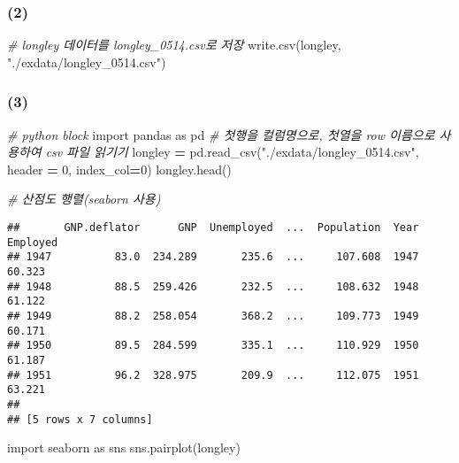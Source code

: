 \documentclass[
]{article}
\newenvironment{Shaded}{\begin{snugshade}}{\end{snugshade}}
\newcommand{\CommentTok}[1]{\textcolor[rgb]{0.56,0.35,0.01}{\textit{#1}}}
\newcommand{\DecValTok}[1]{\textcolor[rgb]{0.00,0.00,0.81}{#1}}
\newcommand{\FunctionTok}[1]{\textcolor[rgb]{0.00,0.00,0.00}{#1}}
\newcommand{\ImportTok}[1]{#1}
\newcommand{\NormalTok}[1]{#1}
\newcommand{\OperatorTok}[1]{\textcolor[rgb]{0.81,0.36,0.00}{\textbf{#1}}}
\newcommand{\StringTok}[1]{\textcolor[rgb]{0.31,0.60,0.02}{#1}}
\begin{document}
\hypertarget{section-2}{%
\subsubsection{(2)}\label{section-2}}

\begin{Shaded}
\begin{Highlighting}[]
\CommentTok{\# longley 데이터를 longley\_0514.csv로 저장}
\FunctionTok{write.csv}\NormalTok{(longley, }\StringTok{"./exdata/longley\_0514.csv"}\NormalTok{)}
\end{Highlighting}
\end{Shaded}

\hypertarget{section-3}{%
\subsubsection{(3)}\label{section-3}}

\begin{Shaded}
\begin{Highlighting}[]
\CommentTok{\# python block}
\ImportTok{import}\NormalTok{ pandas }\ImportTok{as}\NormalTok{ pd}
\CommentTok{\# 첫행을 컬럼명으로, 첫열을 row 이름으로 사용하여 csv 파일 읽기기}
\NormalTok{longley }\OperatorTok{=}\NormalTok{ pd.read\_csv(}\StringTok{"./exdata/longley\_0514.csv"}\NormalTok{, header }\OperatorTok{=} \DecValTok{0}\NormalTok{, index\_col}\OperatorTok{=}\DecValTok{0}\NormalTok{)}
\NormalTok{longley.head()}

\CommentTok{\# 산점도 행렬(seaborn 사용)}
\end{Highlighting}
\end{Shaded}

\begin{verbatim}
##       GNP.deflator      GNP  Unemployed  ...  Population  Year  Employed
## 1947          83.0  234.289       235.6  ...     107.608  1947    60.323
## 1948          88.5  259.426       232.5  ...     108.632  1948    61.122
## 1949          88.2  258.054       368.2  ...     109.773  1949    60.171
## 1950          89.5  284.599       335.1  ...     110.929  1950    61.187
## 1951          96.2  328.975       209.9  ...     112.075  1951    63.221
## 
## [5 rows x 7 columns]
\end{verbatim}

\begin{Shaded}
\begin{Highlighting}[]
\ImportTok{import}\NormalTok{ seaborn }\ImportTok{as}\NormalTok{ sns}
\NormalTok{sns.pairplot(longley)}
\end{Highlighting}
\end{Shaded}
\end{document}
